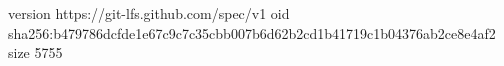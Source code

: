 version https://git-lfs.github.com/spec/v1
oid sha256:b479786dcfde1e67c9c7c35cbb007b6d62b2cd1b41719c1b04376ab2ce8e4af2
size 5755
